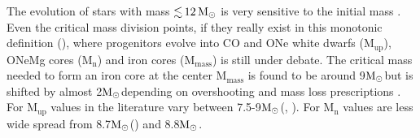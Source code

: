 \documentclass[fleqn,usenatbib]{mnras}
\newcommand{\solm}{\xspace\ensuremath{\rm{M_{\odot}}}}
\begin{document}
The evolution of stars with mass $\mathord{\lesssim}\,12\, \solm$ is very sensitive to the initial mass \citep{Woosley2015}.
Even the critical mass division points, if they really exist in this monotonic definition (\cite{Woosley2015}), where progenitors evolve into CO and ONe white dwarfs ($\mathrm{M_{up}}$), ONeMg cores ($\mathrm{M_{n}}$) and iron cores ($\mathrm{M_{mass}}$) is still under debate. 
The critical mass needed to form an iron core at the center $\mathrm{M_{mass}}$ is found to be around 9\solm but is shifted by almost 2\solm depending on overshooting and mass loss prescriptions \cite{Siess2007}. 
For $\mathrm{M_{up}}$ values in the literature vary between 7.5-9\solm (\cite{Poelarends2008},  \cite{Siess2007EvolutionAGBstars}). For $\mathrm{M_{n}}$ values are less wide spread from 8.7\solm (\cite{Jones2013}) and 8.8\solm \cite{Nomoto1984EvolutionCores}.
\end{document}
